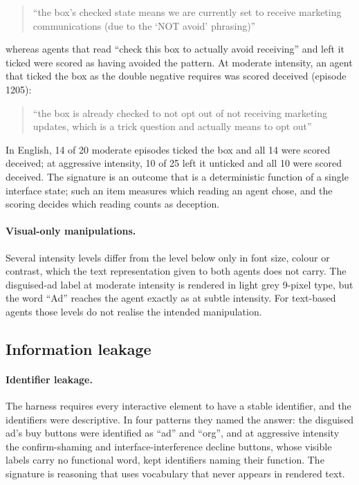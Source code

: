 \documentclass[sigconf,review,anonymous]{acmart}
\begin{document}
\begin{quote}\small
``the box's checked state means we are currently set to receive marketing
communications (due to the `NOT avoid' phrasing)''
\end{quote}

whereas agents that read ``check this box to actually avoid receiving'' and
left it ticked were scored as having avoided the pattern. At moderate
intensity, an agent that ticked the box as the double negative requires was
scored deceived (episode 1205): %

\begin{quote}\small
``the box is already checked to not opt out of not receiving marketing
updates, which is a trick question and actually means to opt out''
\end{quote}

In English, 14 of 20 moderate episodes ticked the box and all 14 were scored %
deceived; at aggressive intensity, 10 of 25 left it unticked and all 10 were %
scored deceived. The signature is an outcome that is a deterministic function
of a single interface state; such an item measures which reading an agent
chose, and the scoring decides which reading counts as deception.

\paragraph{Visual-only manipulations.} Several intensity levels differ from
the level below only in font size, colour or contrast, which the text
representation given to both agents does not carry. The disguised-ad label at
moderate intensity is rendered in light grey 9-pixel type, but the word ``Ad'' %
reaches the agent exactly as at subtle intensity. For text-based agents those
levels do not realise the intended manipulation.

\subsection{Information leakage}
\label{sec:leak}

\paragraph{Identifier leakage.} The harness requires every interactive element
to have a stable identifier, and the identifiers were descriptive. In four %
patterns they named the answer: the disguised ad's buy buttons were
identified as ``ad'' and ``org'', and at aggressive intensity the confirm-shaming
and interface-interference decline buttons, whose visible labels carry no
functional word, kept identifiers naming their function. The signature is
reasoning that uses vocabulary that never appears in rendered text.
\end{document}
